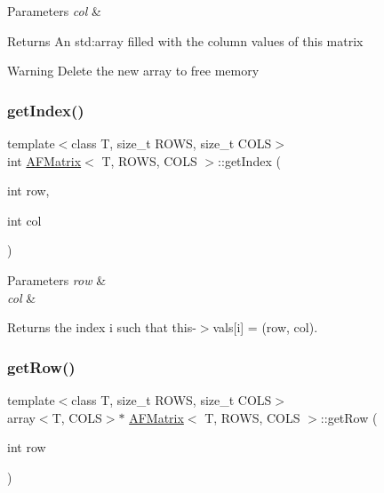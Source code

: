 \begin{DoxyParams}{Parameters}
{\em col} & \\
\hline
\end{DoxyParams}
\begin{DoxyReturn}{Returns}
An {\ttfamily std\+:array} filled with the column values of this matrix 
\end{DoxyReturn}
\begin{DoxyWarning}{Warning}
Delete the new array to free memory 
\end{DoxyWarning}
\mbox{\label{class_a_f_matrix_aff522a072446367c8e224c955a7743c1}} 
\subsubsection{\texorpdfstring{get\+Index()}{getIndex()}}
{\footnotesize\ttfamily template$<$class T, size\+\_\+t R\+O\+WS, size\+\_\+t C\+O\+LS$>$ \\
int \hyperlink{class_a_f_matrix}{A\+F\+Matrix}$<$ T, R\+O\+WS, C\+O\+LS $>$\+::get\+Index (\begin{DoxyParamCaption}\item[{int}]{row,  }\item[{int}]{col }\end{DoxyParamCaption})\hspace{0.3cm}{\ttfamily [inline]}}


\begin{DoxyParams}{Parameters}
{\em row} & \\
\hline
{\em col} & \\
\hline
\end{DoxyParams}
\begin{DoxyReturn}{Returns}
the index {\ttfamily i} such that {\ttfamily this-\/$>$vals\mbox{[}i\mbox{]} = (row, col)}. 
\end{DoxyReturn}
\mbox{\label{class_a_f_matrix_a0ddbf6fe5a2aa085d7f2bc7b99bfa8bc}} 
\subsubsection{\texorpdfstring{get\+Row()}{getRow()}}
{\footnotesize\ttfamily template$<$class T, size\+\_\+t R\+O\+WS, size\+\_\+t C\+O\+LS$>$ \\
array$<$T, C\+O\+LS$>$$\ast$ \hyperlink{class_a_f_matrix}{A\+F\+Matrix}$<$ T, R\+O\+WS, C\+O\+LS $>$\+::get\+Row (\begin{DoxyParamCaption}\item[{int}]{row }\end{DoxyParamCaption})\hspace{0.3cm}{\ttfamily [inline]}}


